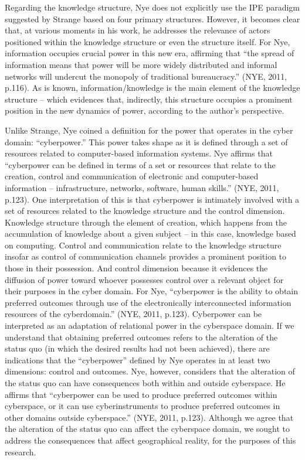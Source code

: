 Regarding the knowledge structure, Nye does not explicitly use the IPE paradigm suggested by Strange based on four primary structures. However, it becomes clear that, at various moments in his work, he addresses the relevance of actors positioned within the knowledge structure or even the structure itself. For Nye, information occupies crucial power in this new era, affirming that ``the spread of information means that power will be more widely distributed and informal networks will undercut the monopoly of traditional bureaucracy.'' (NYE, 2011, p.116). As is known, information/knowledge is the main element of the knowledge structure -- which evidences that, indirectly, this structure occupies a prominent position in the new dynamics of power, according to the author's perspective.

Unlike Strange, Nye coined a definition for the power that operates in the cyber domain: ``cyberpower.'' This power takes shape as it is defined through a set of resources related to computer-based information systems. Nye affirms that ``cyberpower can be defined in terms of a set or resources that relate to the creation, control and communication of electronic and computer-based information -- infrastructure, networks, software, human skills.'' (NYE, 2011, p.123). One interpretation of this is that cyberpower is intimately involved with a set of resources related to the knowledge structure and the control dimension. Knowledge structure through the element of creation, which happens from the accumulation of knowledge about a given subject -- in this case, knowledge based on computing. Control and communication relate to the knowledge structure insofar as control of communication channels provides a prominent position to those in their possession. And control dimension because it evidences the diffusion of power toward whoever possesses control over a relevant object for their purposes in the cyber domain. For Nye, ``cyberpower is the ability to obtain preferred outcomes through use of the electronically interconnected information resources of the cyberdomain.'' (NYE, 2011, p.123). Cyberpower can be interpreted as an adaptation of relational power in the cyberspace domain. If we understand that obtaining preferred outcomes refers to the alteration of the status quo (in which the desired results had not been achieved), there are indications that the ``cyberpower'' defined by Nye operates in at least two dimensions: control and outcomes. Nye, however, considers that the alteration of the status quo can have consequences both within and outside cyberspace. He affirms that ``cyberpower can be used to produce preferred outcomes within cyberspace, or it can use cyberinstruments to produce preferred outcomes in other domains outside cyberspace.'' (NYE, 2011, p.123). Although we agree that the alteration of the status quo can affect the cyberspace domain, we sought to address the consequences that affect geographical reality, for the purposes of this research.


